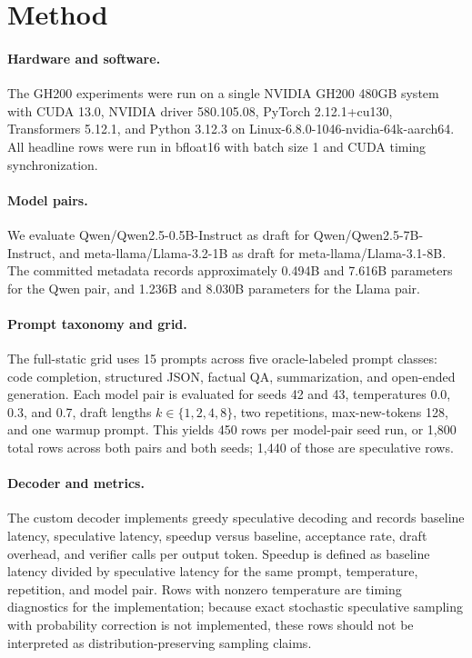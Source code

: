\documentclass{article}
\begin{document}
\section{Method}

\paragraph{Hardware and software.}
The GH200 experiments were run on a single NVIDIA GH200 480GB system with CUDA 13.0, NVIDIA driver 580.105.08, PyTorch 2.12.1+cu130, Transformers 5.12.1, and Python 3.12.3 on Linux-6.8.0-1046-nvidia-64k-aarch64.
All headline rows were run in bfloat16 with batch size 1 and CUDA timing synchronization.

\paragraph{Model pairs.}
We evaluate Qwen/Qwen2.5-0.5B-Instruct as draft for Qwen/Qwen2.5-7B-Instruct, and meta-llama/Llama-3.2-1B as draft for meta-llama/Llama-3.1-8B.
The committed metadata records approximately 0.494B and 7.616B parameters for the Qwen pair, and 1.236B and 8.030B parameters for the Llama pair.

\paragraph{Prompt taxonomy and grid.}
The full-static grid uses 15 prompts across five oracle-labeled prompt classes: code completion, structured JSON, factual QA, summarization, and open-ended generation.
Each model pair is evaluated for seeds 42 and 43, temperatures 0.0, 0.3, and 0.7, draft lengths $k \in \{1,2,4,8\}$, two repetitions, max-new-tokens 128, and one warmup prompt.
This yields 450 rows per model-pair seed run, or 1,800 total rows across both pairs and both seeds; 1,440 of those are speculative rows.

\paragraph{Decoder and metrics.}
The custom decoder implements greedy speculative decoding and records baseline latency, speculative latency, speedup versus baseline, acceptance rate, draft overhead, and verifier calls per output token.
Speedup is defined as baseline latency divided by speculative latency for the same prompt, temperature, repetition, and model pair.
Rows with nonzero temperature are timing diagnostics for the implementation; because exact stochastic speculative sampling with probability correction is not implemented, these rows should not be interpreted as distribution-preserving sampling claims.
\end{document}
